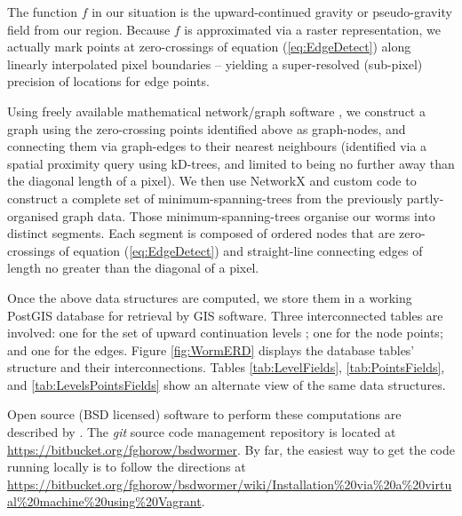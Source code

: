 \documentclass[extra]{article}
\begin{document}
The function \(f\) in our situation is the upward-continued gravity or pseudo-gravity field from our region. 
Because \(f\) is approximated via a raster representation, we actually mark points at zero-crossings of equation (\ref{eq:EdgeDetect}) along linearly interpolated pixel boundaries -- yielding a super-resolved (sub-pixel) precision of locations for edge points.

Using freely available mathematical network/graph software \citep[NetworkX; ][]{NetworkX}, we construct a graph using the zero-crossing points identified above as graph-nodes, and connecting them via graph-edges to their nearest neighbours (identified via a spatial proximity query using kD-trees, and limited to being no further away than the diagonal length of a pixel). We then use NetworkX and custom code to construct a complete set of minimum-spanning-trees from the previously partly-organised graph data. Those minimum-spanning-trees organise our worms into distinct segments. Each segment is composed of ordered nodes that are zero-crossings of equation (\ref{eq:EdgeDetect}) and straight-line connecting edges of length no greater than the diagonal of a pixel.

Once the above data structures are computed, we store them in a working PostGIS database for retrieval by GIS software. Three interconnected tables are involved: one for the set of upward continuation levels \citep[equivalent to underground depth via the inverse wavelet transform arguments in][]{BHH01,HHB02}; one for the node points; and one for the edges. Figure \ref{fig:WormERD} displays the database tables' structure and their interconnections. Tables \ref{tab:LevelFields}, \ref{tab:PointsFields}, and \ref{tab:LevelsPointsFields} show an alternate view of the same data structures.

Open source (BSD licensed) software to perform these computations are described by \citet{HorowitzGaede14}. The \emph{git} source code management repository is located at \url{https://bitbucket.org/fghorow/bsdwormer}. By far, the easiest way to get the code running locally is to follow the directions at \url{https://bitbucket.org/fghorow/bsdwormer/wiki/Installation\%20via\%20a\%20virtual\%20machine\%20using\%20Vagrant}. 
\end{document}
